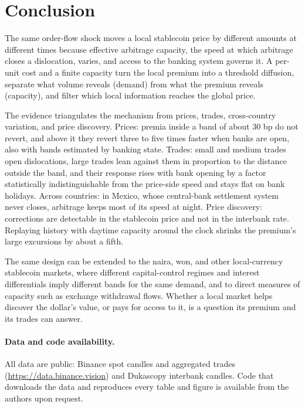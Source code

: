 \documentclass[12pt]{article}
\theoremstyle{definition}
\theoremstyle{remark}
\begin{document}
\section{Conclusion}\label{sec:conclusion}

The same order-flow shock moves a local stablecoin price by different amounts at different times because effective arbitrage capacity, the speed at which arbitrage closes a dislocation, varies, and access to the banking system governs it. A per-unit cost and a finite capacity turn the local premium into a threshold diffusion, separate what volume reveals (demand) from what the premium reveals (capacity), and filter which local information reaches the global price.

The evidence triangulates the mechanism from prices, trades, cross-country variation, and price discovery. Prices: premia inside a band of about 30 bp do not revert, and above it they revert three to five times faster when banks are open, also with bands estimated by banking state. Trades: small and medium trades open dislocations, large trades lean against them in proportion to the distance outside the band, and their response rises with bank opening by a factor statistically indistinguishable from the price-side speed and stays flat on bank holidays. Across countries: in Mexico, whose central-bank settlement system never closes, arbitrage keeps most of its speed at night. Price discovery: corrections are detectable in the stablecoin price and not in the interbank rate. Replaying history with daytime capacity around the clock shrinks the premium's large excursions by about a fifth.

The same design can be extended to the naira, won, and other local-currency stablecoin markets, where different capital-control regimes and interest differentials imply different bands for the same demand, and to direct measures of capacity such as exchange withdrawal flows. Whether a local market helps discover the dollar's value, or pays for access to it, is a question its premium and its trades can answer.

\paragraph{Data and code availability.} All data are public: Binance spot candles and aggregated trades (\url{https://data.binance.vision}) and Dukascopy interbank candles. Code that downloads the data and reproduces every table and figure is available from the authors upon request.
\end{document}
